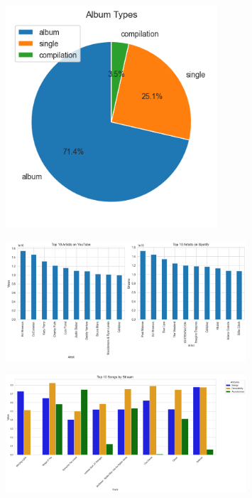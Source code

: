 \documentclass{article}
\begin{document}
\begin{figure}[ht]
    \centering
    \includegraphics[width=0.7\textwidth]{img/albumtypes.png} %
    \caption{} %
\end{figure}
\begin{figure}[ht]
    \centering
    \includegraphics[width=0.8\textwidth]{img/top10artists.png} %
    \caption{} %
\end{figure}
\begin{figure}[ht]
    \centering
    \includegraphics[width=0.8\textwidth]{img/topsongs.png} %
    \caption{} %
\end{figure}
\end{document}
